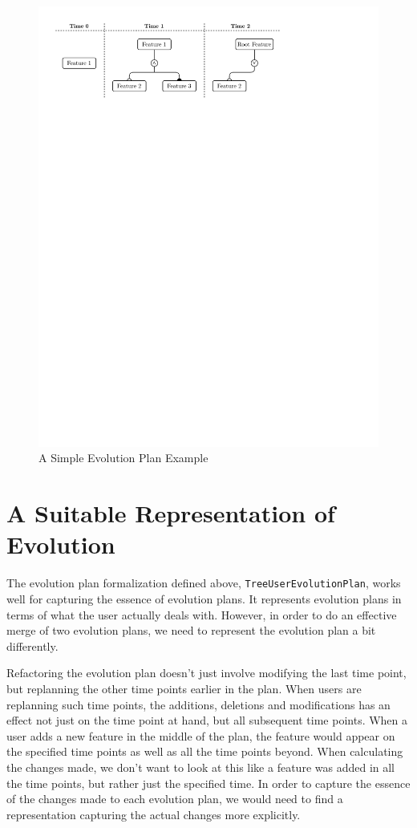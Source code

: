 \documentclass[a4paper,english]{ifimaster}
\begin{document}
\begin{figure}[htpb]
  \centering
  \includegraphics[]{simpleep_treeuser.pdf}
  \caption{A Simple Evolution Plan Example}%
  \label{fig:simpleep_treeuser}
\end{figure}

\section{A Suitable Representation of Evolution}%
\label{sec:a_suitable_representation_of_evolution}

The evolution plan formalization defined above, \texttt{TreeUserEvolutionPlan}, works well for capturing the essence of evolution plans. It represents evolution plans in terms of what the user actually deals with. However, in order to do an effective merge of two evolution plans, we need to represent the evolution plan a bit differently.

Refactoring the evolution plan doesn't just involve modifying the last time point, but replanning the other time points earlier in the plan. When users are replanning such time points, the additions, deletions and modifications has an effect not just on the time point at hand, but all subsequent time points. When a user adds a new feature in the middle of the plan, the feature would appear on the specified time points as well as all the time points beyond. When calculating the changes made, we don't want to look at this like a feature was added in all the time points, but rather just the specified time. In order to capture the essence of the changes made to each evolution plan, we would need to find a representation capturing the actual changes more explicitly.
\end{document}
